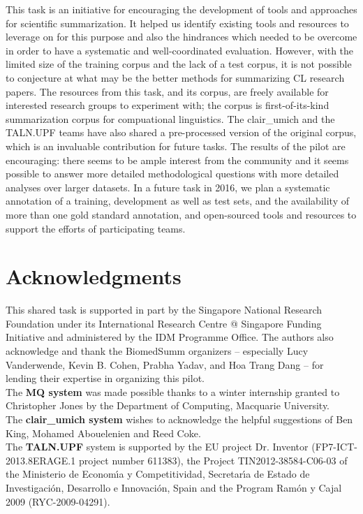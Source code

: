 \documentclass[11pt]{article}
\begin{document}
This task is an initiative for encouraging the development of tools and 
approaches for scientific summarization. It helped us identify 
existing tools and resources to leverage on for this purpose
and also the hindrances which needed to be overcome in order to have a 
systematic and well-coordinated evaluation. However, with the limited size of the training corpus and the lack of a test corpus, %
it is not possible to conjecture at what may be the 
better methods for summarizing CL research papers. The 
resources from this task, and its corpus, are freely available 
for interested research groups to experiment with; the corpus is 
first-of-its-kind summarization corpus for compuational linguistics. 
The clair\_umich and the
TALN.UPF teams have also shared a pre-processed version of the original corpus, which
is an invaluable contribution for future tasks.
The results of the pilot are encouraging: there seems to be ample
interest from the community and it seems possible to answer more
detailed methodological questions with more detailed analyses over
larger datasets.  In a future task in 2016, we plan a
systematic annotation of a training, development as well as test sets,
and the availability of more than one gold standard annotation, and
open-sourced tools and resources to support the efforts of
participating teams. 



\section{Acknowledgments}
 This shared task is supported in part by the Singapore National
 Research Foundation under its International Research Centre @
 Singapore Funding Initiative and administered by the IDM Programme
 Office.  The authors also acknowledge and thank the BiomedSumm
 organizers -- especially Lucy Vanderwende, Kevin B. Cohen, Prabha
 Yadav, and Hoa Trang Dang -- for lending their expertise in
 organizing this pilot.\\ The {\bf MQ system} was made possible thanks
 to a winter internship granted to Christopher Jones by the Department
 of Computing, Macquarie University. \\ The {\bf clair\_umich system}
 wishes to acknowledge the helpful suggestions of Ben King, Mohamed
 Abouelenien and Reed Coke. \\ The {\bf TALN.UPF} system is supported
 by the EU project Dr. Inventor (FP7-ICT-2013.8ERAGE.1 project number 
 611383), the Project TIN2012-38584-C06-03 of the Ministerio de 
 Econom\'{\i}a y Competitividad, Secretar\'{\i}a de Estado de 
 Investigaci\'on, Desarrollo e Innovaci\'on, Spain and the Program 
 Ram\'on y Cajal 2009 (RYC-2009-04291).


\end{document}
